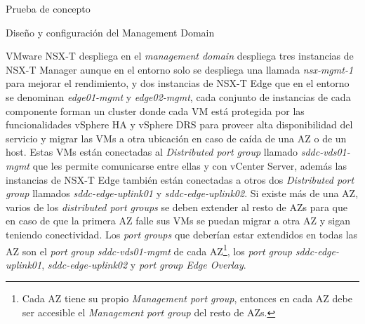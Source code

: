 \begin{section}{Prueba de concepto}
\begin{subsection}{Diseño y configuración del Management Domain}
    
    VMware NSX-T despliega en el \textit{management domain} despliega tres instancias de NSX-T Manager aunque en el entorno solo se despliega una llamada \textit{nsx-mgmt-1} para mejorar el rendimiento, y dos instancias de NSX-T Edge que en el entorno se denominan \textit{edge01-mgmt} y \textit{edge02-mgmt}, cada conjunto de instancias de cada componente forman un cluster donde cada VM está protegida por las funcionalidades vSphere HA y vSphere DRS para proveer alta disponibilidad del servicio y migrar las VMs a otra ubicación en caso de caída de una AZ o de un host. Estas VMs están conectadas al \textit{Distributed port group} llamado \textit{sddc-vds01-mgmt} que les permite comunicarse entre ellas y con vCenter Server, además las instancias de NSX-T Edge también están conectadas a otros dos \textit{Distributed port group} llamados \textit{sddc-edge-uplink01} y \textit{sddc-edge-uplink02}. Si existe más de una AZ, varios de los \textit{distributed port groups} se deben extender al resto de AZs para que en caso de que la primera AZ falle sus VMs se puedan migrar a otra AZ y sigan teniendo conectividad. Los \textit{port groups} que deberían estar extendidos en todas las AZ son el \textit{port group} \textit{sddc-vds01-mgmt} de cada AZ\footnote{Cada AZ tiene su propio \textit{Management port group}, entonces en cada AZ debe ser accesible el \textit{Management port group} del resto de AZs.}, los \textit{port group} \textit{sddc-edge-uplink01}, \textit{sddc-edge-uplink02} y \textit{port group} \textit{Edge Overlay}.
    

\end{subsection}
\end{section}
